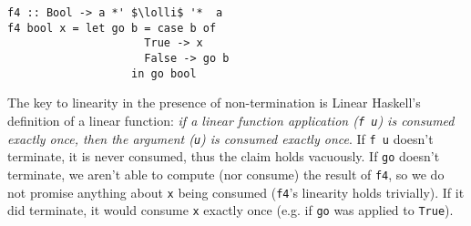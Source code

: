 \documentclass[acmsmall,review,anonymous,screen]{acmart}
\newcommand{\incode}[1]{\lstinline{#1}}
\newcommand{\lolli}{\multimap}
\begin{document}
\begin{notyet}
\begin{lstlisting}
f4 :: Bool -> a *' $\lolli$ '*  a
f4 bool x = let go b = case b of
                     True -> x
                     False -> go b
                   in go bool
          \end{lstlisting}
        \end{notyet}

The key to linearity in the presence of non-termination is Linear Haskell's
definition of a linear function: \emph{if a linear function application (\incode{f u}) is
consumed exactly once, then the argument (\incode{u}) is consumed exactly once}.
If \incode{f u} doesn't terminate, it is never consumed, thus the claim holds
vacuously.
%
If \incode{go} doesn't terminate, we aren't able to compute (nor consume) the result
of \incode{f4}, so we do not promise anything about \incode{x} being consumed (\incode{f4}'s
linearity holds trivially). If it did terminate, it would consume \incode{x} exactly
once (e.g. if \incode{go} was applied to \incode{True}).
\end{document}
